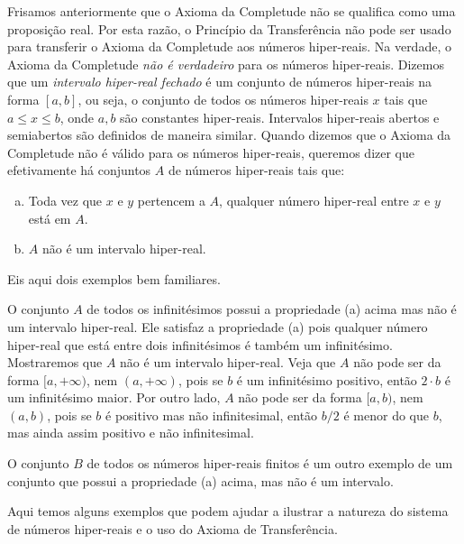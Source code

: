 Frisamos anteriormente que o Axioma da Completude não se qualifica como
uma proposição real. Por esta razão, o Princípio da Transferência não
pode ser usado para transferir o Axioma da Completude aos números
hiper-reais. Na verdade, o Axioma da Completude \emph{não é verdadeiro}
para os números hiper-reais. Dizemos que um \emph{intervalo hiper-real
fechado} é um conjunto de números hiper-reais na forma $[a, b]$, ou seja,
o conjunto de todos os números hiper-reais $x$ tais que $a \le x \le b$,
onde $a, b$ são constantes hiper-reais. Intervalos hiper-reais abertos
e semiabertos são definidos de maneira similar. Quando dizemos que o
Axioma da Completude não é válido para os números hiper-reais, queremos
dizer que efetivamente há conjuntos $A$ de números hiper-reais tais que:

\begin{enumerate}[(a)]
\item Toda vez que $x$ e $y$ pertencem a $A$, qualquer número hiper-real
entre $x$ e $y$ está em $A$.
\item $A$ não é um intervalo hiper-real.
\end{enumerate}

Eis aqui dois exemplos bem familiares.

\begin{example}
O conjunto $A$ de todos os infinitésimos possui a propriedade (a) acima
mas não é um intervalo hiper-real. Ele satisfaz a propriedade (a) pois
qualquer número hiper-real que está entre dois infinitésimos é também um
infinitésimo. Mostraremos que $A$ não é um intervalo hiper-real. Veja que
$A$ não pode ser da forma $[a, +\infty)$, nem $(a, +\infty)$, pois se $b$
é um infinitésimo positivo, então $2 \cdot b$ é um infinitésimo maior.
Por outro lado, $A$ não pode ser da forma $[a, b)$, nem $(a, b)$, pois se
$b$ é positivo mas não infinitesimal, então $b/2$ é menor do que $b$, mas
ainda assim positivo e não infinitesimal.
\end{example}

O conjunto $B$ de todos os números hiper-reais finitos é um outro exemplo
de um conjunto que possui a propriedade (a) acima, mas não é um intervalo.

Aqui temos alguns exemplos que podem ajudar a ilustrar a natureza do
sistema de números hiper-reais e o uso do Axioma de Transferência.

